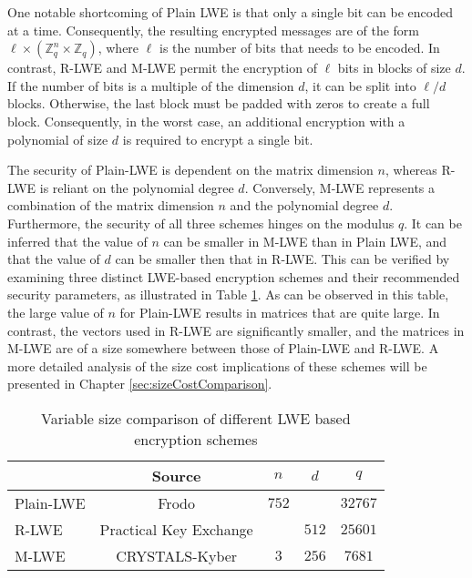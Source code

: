 One notable shortcoming of Plain LWE is that only a single bit can be encoded at a time. Consequently, the resulting encrypted messages are of the form $\ell \times (\mathbb{Z}_q^{n}\times\mathbb{Z}_q)$, where $\ell$ is the number of bits that needs to be encoded. In contrast, R-LWE and M-LWE permit the encryption of $\ell$ bits in blocks of size $d$. If the number of bits is a multiple of the dimension $d$, it can be split into $\ell / d$ blocks. Otherwise, the last block must be padded with zeros to create a full block. Consequently, in the worst case, an additional encryption with a polynomial of size $d$ is required to encrypt a single bit.

The security of Plain-LWE is dependent on the matrix dimension $n$, whereas R-LWE is reliant on the polynomial degree $d$. Conversely, M-LWE represents a combination of the matrix dimension $n$ and the polynomial degree $d$.  
Furthermore, the security of all three schemes hinges on the modulus $q$. It can be inferred that the value of $n$ can be smaller in M-LWE than in Plain LWE, and that the value of $d$ can be smaller then that in R-LWE. This can be verified by examining three distinct LWE-based encryption schemes and their recommended security parameters, as illustrated in Table \ref{table:LweParameterComparison}. As can be observed in this table, the large value of $n$ for Plain-LWE results in matrices that are quite large. In contrast, the vectors used in R-LWE are significantly smaller, and the matrices in M-LWE are of a size somewhere between those of Plain-LWE and R-LWE. A more detailed analysis of the size cost implications of these schemes will be presented in Chapter \ref{sec:sizeCostComparison}.

\begin{table}[h]
  \centering
  \caption{Variable size comparison of different LWE based encryption schemes}
  \begin{tabular}{|l|c|c|c|c|}
    \toprule
              & Source                                             & $n$   & $d$   & $q$     \\
    
    \midrule
    Plain-LWE & Frodo \cite{frodo}                                 & $752$ &       & $32767$ \\
    R-LWE     & Practical Key Exchange \cite{PracticalKeyExchange} &       & $512$ & $25601$ \\
    M-LWE     & CRYSTALS-Kyber \cite{CyrstalsKyber}                & $3$   & $256$ & $7681$  \\   
    \bottomrule
  \end{tabular}
  \label{table:LweParameterComparison}
\end{table}

